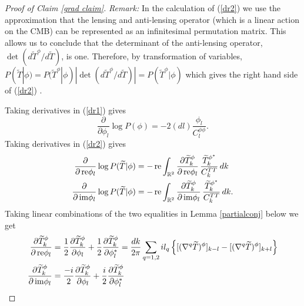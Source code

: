 \documentclass[noinfoline]{imsart}
\newcommand{\re}{\text{\,\rm re}}
\newcommand{\im}{\text{\,\rm im}}
\begin{document}
\begin{proof}[{ Proof of Claim \ref{grad claim}}]
{\em Remark:}
In the calculation  of (\ref{dr2}) we use the approximation that the lensing and anti-lensing operator (which is a linear action on the CMB) can be represented as an infinitesimal permutation matrix. This allows us to conclude that the determinant of the anti-lensing operator, $\det( d \widetilde T^\phi / d\widetilde T)$, is one. Therefore, by transformation of variables,   $P(\widetilde T|\phi) = P(\widetilde T^\phi|\phi) |\det( d \widetilde T^\phi / d\widetilde T)| = P(\widetilde T^\phi|\phi)$ which gives the right hand side of (\ref{dr2}) .


Taking derivatives in (\ref{dr1}) gives
\begin{equation}
\label{grad of prior}
\frac{\partial}{\partial \phi_l}\log P(\phi) = - 2(dl) \frac{\phi_l}{C^{\phi\phi}_{l}}.
\end{equation}
Taking derivatives in (\ref{dr2}) gives
\begin{align}
\frac{\partial}{\partial \re\phi_l}\log P(\widetilde T| \phi) 
&= - \re \int_{\Bbb R^2} \frac{\partial \widetilde T_k^{\phi}}{\partial \re\phi_l} \, \frac{\widetilde T_k^{\phi^*}}{C_k^{TT}}  \,dk \label{ll1}\\
\frac{\partial}{\partial \im\phi_l}\log P(\widetilde T| \phi) 
&=  -\re \int_{\Bbb R^2}\frac{\partial \widetilde T_k^{\phi}}{\partial \im\phi_l} \, \frac{\widetilde T_k^{\phi^*}}{C_k^{TT}} \, dk \label{ll2}.
\end{align}
Taking linear combinations of the two equalities in Lemma \ref{partialconj} below we get
\begin{align}
\frac{\partial \widetilde T^\phi_k}{\partial \re \phi_{l}}  &= 
\frac{1}{2}\frac{\partial \widetilde T^\phi_k}{\partial\phi_{l}} + \frac{1}{2}\frac{\partial \widetilde T^\phi_k}{\partial\phi^*_{l}}
=
\frac{dk}{2 \pi}  \sum_{q=1,2} il_q\left\{ [(\nabla^q\widetilde T)^\phi]_{k-l}  -   [(\nabla^q\widetilde T)^\phi]_{k+l}  \right\}\\
\frac{\partial \widetilde T^\phi_k}{\partial \im \phi_{l} }  &= 
\frac{-i}{2}\frac{\partial \widetilde T^\phi_k}{\partial\phi_{l}} + \frac{i}{2}\frac{\partial \widetilde T^\phi_k}{\partial\phi^*_{l}}

\end{align}
\end{proof}
\end{document}
